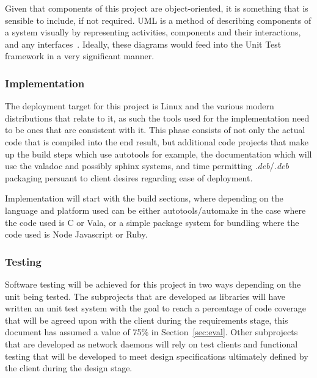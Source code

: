 \documentclass[11pt]{article}
\begin{document}
        Given that components of this project are object-oriented, it is
        something that is sensible to include, if not required. UML is a method
        of describing components of a system visually by representing
        activities, components and their interactions, and any
        interfaces~. Ideally, these diagrams would feed
        into the Unit Test framework in a very significant manner.

      \subsubsection{Implementation}\label{sec:soln-model-implementation}

        The deployment target for this project is Linux and the various modern
        distributions that relate to it, as such the tools used for the
        implementation need to be ones that are consistent with it. This phase
        consists of not only the actual code that is compiled into the end
        result, but additional code projects that make up the build steps which
        use autotools for example, the documentation which will use the valadoc
        and possibly sphinx systems, and time permitting \emph{.deb}/\emph{.deb}
        packaging persuant to client desires regarding ease of deployment.

        Implementation will start with the build sections, where depending on
        the language and platform used can be either autotools/automake in the
        case where the code used is C or Vala, or a simple package system for
        bundling where the code used is Node Javascript or Ruby.

      \subsubsection{Testing}\label{sec:soln-model-testing}

        Software testing will be achieved for this project in two ways
        depending on the unit being tested. The subprojects that are developed
        as libraries will have written an unit test system with the goal to
        reach a percentage of code coverage that will be agreed upon with the
        client during the requirements stage, this document has assumed a value
        of 75$\%$ in Section~\ref{sec:eval}. Other subprojects that are
        developed as network daemons will rely on test clients and functional
        testing that will be developed to meet design specifications ultimately
        defined by the client during the design stage.
\end{document}
